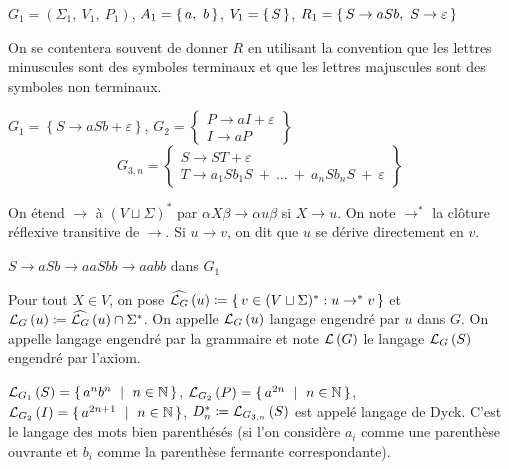 \documentclass[../../agregation.tex]{subfiles}
\begin{document}
\begin{example}
	$G_{1}=\left(\Sigma_{1},\ V_{1},\ P_{1}\right)$, $A_{1}=\set{a,\ b}$,
	$V_{1}=\set S$, $R_{1}=\set{S\to aSb,\ S\to\varepsilon}$
\end{example}

\begin{rem}
	On se contentera souvent de donner $R$ en utilisant la convention
	que les lettres minuscules sont des symboles terminaux et que les
	lettres majuscules sont des symboles non terminaux.
\end{rem}

\begin{example}
	$G_{1}=\left\{ S\to aSb+\varepsilon\right\} $, $G_{2}=\left\{ \begin{array}{c}
	P\to aI+\varepsilon\\
	I\to aP
	\end{array}\right\} $
	$$G_{3,n}=\left\{ \begin{array}{c}
	S\to ST+\varepsilon\\
	T\to a_{1}Sb_{1}S\ +\ \dots\ +\ a_{n}Sb_{n}S\ +\ \varepsilon
	\end{array}\right\} $$
\end{example}

\begin{defn}[Dérivation]
	On étend $\to$ à $(V\sqcup\Sigma)^*$ par $\alpha X \beta \to \alpha u \beta$ si $X\to u$. On note $\to^*$ la clôture réflexive transitive de $\to$. Si $u\to v$, on dit que $u$ se dérive directement en $v$.
\end{defn}

\begin{example}
	$S\to aSb\to aaSbb\to aabb$ dans $G_{1}$
\end{example}

\begin{defn}
	Pour tout $X\in V$, on pose $\widehat{\mathcal{L}_{G}}\left(u\right)\coloneqq \set{v\in (V\sqcup\Sigma)^*:u\to^* v}$ et $\mathcal{L}_{G}\left(u\right)\coloneqq \widehat{\mathcal{L}_{G}}\left(u\right)\cap \Sigma^*$. On appelle $\mathcal{L}_{G}\left(u\right)$ langage engendré par $u$ dans $G$. On appelle langage engendré par la grammaire et note $\mathcal{L}\left(G\right)$ le langage $\mathcal{L}_{G}\left(S\right)$ engendré par l'axiom.
\end{defn}

\begin{example}
	$\L_{G_{1}}\left(S\right)=\set{a^{n}b^{n}\ |\ n\in\N}$, $\L_{G_{2}}\left(P\right)=\set{a^{2n}\ |\ n\in\N}$,
	$\L_{G_{2}}\left(I\right)=\set{a^{2n+1}\ |\ n\in\N}$, $D_{n}^{*}\coloneqq\mathcal{L}_{G_{3,n}}\left(S\right)$
	est appelé langage de Dyck. C'est le langage des mots bien parenthésés
	(si l'on considère $a_{i}$ comme une parenthèse ouvrante et $b_{i}$
	comme la parenthèse fermante correspondante).
\end{example}
\end{document}
